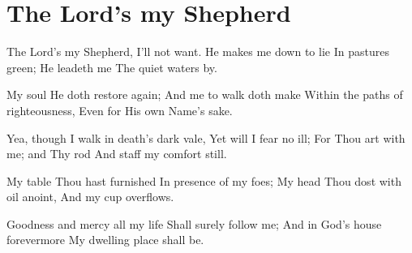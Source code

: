 \starttocol
\chapter{The Lord's my Shepherd}
\nexttocol
\hfill{\it }
\stoptocol
\starttocol
\startlines
{\sc The Lord}'s my Shepherd, I'll not want.
He makes me down to lie
In pastures green; He leadeth me
The quiet waters by.

My soul He doth restore again;
And me to walk doth make
Within the paths of righteousness,
Even for His own Name's sake.

Yea, though I walk in death's dark vale,
Yet will I fear no ill;
For Thou art with me; and Thy rod
And staff my comfort still.

My table Thou hast furnished
In presence of my foes;
My head Thou dost with oil anoint,
And my cup overflows.

Goodness and mercy all my life
Shall surely follow me;
And in God's house forevermore
My dwelling place shall be.
\stoplines
\nexttocol

\stoptocol
